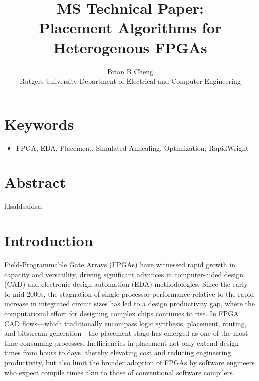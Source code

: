 \documentclass[twocolumn]{article}
\begin{document}
\title{MS Technical Paper: \\ Placement Algorithms for Heterogenous FPGAs}
\author{Brian B Cheng \\ Rutgers University Department of Electrical and Computer Engineering}


\date{}
\maketitle

\section{Keywords}
\begin{itemize}
    \item FPGA, EDA, Placement, Simulated Annealing, Optimization, RapidWright
\end{itemize}


\section{Abstract}
    fdsafdsafdsa.

\section{Introduction}

    Field-Programmable Gate Arrays (FPGAs) have witnessed rapid growth in capacity and versatility, driving significant advances in computer-aided design (CAD) and electronic design automation (EDA) methodologies. 
    Since the early-to-mid 2000s, the stagnation of single-processor performance relative to the rapid increase in integrated circuit sizes has led to a design productivity gap, where the computational effort for designing complex chips continues to rise. 
    In FPGA CAD flows—which traditionally encompass logic synthesis, placement, routing, and bitstream generation—the placement stage has emerged as one of the most time-consuming processes. 
    Inefficiencies in placement not only extend design times from hours to days, thereby elevating cost and reducing engineering productivity, but also limit the broader adoption of FPGAs by software engineers who expect compile times akin to those of conventional software compilers. 
\end{document}
